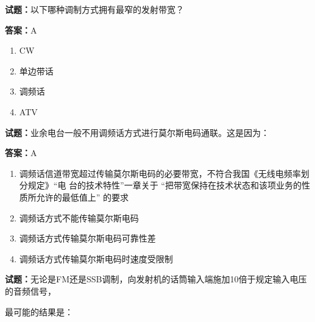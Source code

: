 \documentclass{ctexbook}
\begin{document}




\vspace{1em}

\textbf{试题：}以下哪种调制方式拥有最窄的发射带宽？ 

\textbf{答案：}A 

\begin{enumerate}[leftmargin=3em]
  \item CW 

  \item 单边带话 

  \item 调频话 

  \item ATV 

\end{enumerate}





\vspace{1em}

\textbf{试题：}业余电台一般不用调频话方式进行莫尔斯电码通联。这是因为： 

\textbf{答案：}A 

\begin{enumerate}[leftmargin=3em]
  \item 调频话信道带宽超过传输莫尔斯电码的必要带宽，不符合我国《无线电频率划分规定》“电
台的技术特性”一章关于 “把带宽保持在技术状态和该项业务的性质所允许的最低值上”
的要求 

  \item 调频话方式不能传输莫尔斯电码 

  \item 调频话方式传输莫尔斯电码可靠性差 

  \item 调频话方式传输莫尔斯电码时速度受限制 

\end{enumerate}





\vspace{1em}

\textbf{试题：}无论是FM还是SSB调制，向发射机的话筒输入端施加10倍于规定输入电压的音频信号，


最可能的结果是： 
\end{document}
